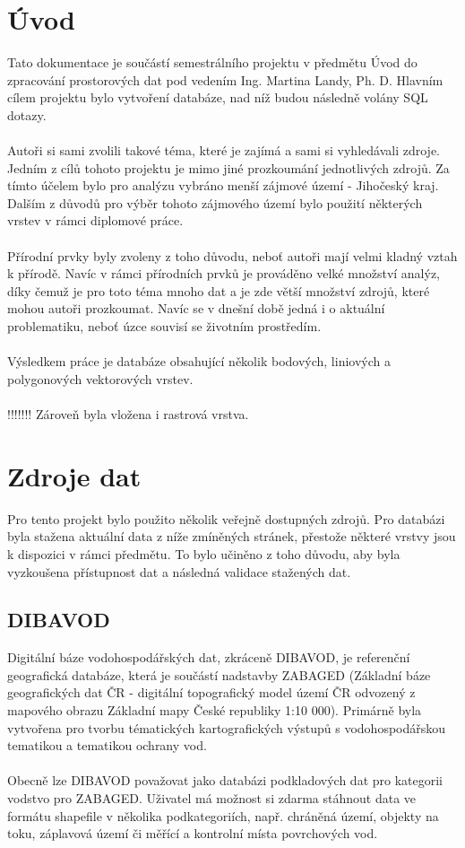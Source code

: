 \documentclass[a4paper, 12pt]{article}
\begin{document}
\section{Úvod}
Tato dokumentace je součástí semestrálního projektu v předmětu Úvod do zpracování prostorových dat pod vedením Ing. Martina Landy, Ph. D. Hlavním cílem projektu bylo vytvoření databáze, nad níž budou následně volány SQL dotazy.\\
\\
Autoři si sami zvolili takové téma, které je zajímá a sami si vyhledávali zdroje. Jedním z cílů tohoto projektu je mimo jiné prozkoumání jednotlivých zdrojů. Za tímto účelem bylo pro analýzu vybráno menší zájmové území - Jihočeský kraj. Dalším z důvodů pro výběr tohoto zájmového území bylo použití některých vrstev v rámci diplomové práce. \\
\\
Přírodní prvky byly zvoleny z toho důvodu, neboť autoři mají velmi kladný vztah k přírodě. Navíc v rámci přírodních prvků je prováděno velké množství analýz, díky čemuž je pro toto téma mnoho dat a je zde větší množství zdrojů, které mohou autoři prozkoumat. Navíc se v dnešní době jedná i o aktuální problematiku, neboť úzce souvisí se životním prostředím.\\
\\
Výsledkem práce je databáze obsahující několik bodových, liniových a polygonových vektorových vrstev. \\
\\

!!!!!!! Zároveň byla vložena i rastrová vrstva.

\clearpage
\section{Zdroje dat}
Pro tento projekt bylo použito několik veřejně dostupných zdrojů. Pro databázi byla stažena aktuální data z níže zmíněných stránek, přestože některé vrstvy jsou k dispozici v rámci předmětu. To bylo učiněno z toho důvodu, aby byla vyzkoušena přístupnost dat a následná validace stažených dat. 

\subsection{DIBAVOD}
Digitální báze vodohospodářských dat, zkráceně DIBAVOD, je referenční geografická databáze, která je součástí nadstavby ZABAGED (Základní báze geografických dat ČR - digitální topografický model území ČR odvozený z mapového obrazu Základní mapy České republiky 1:10 000). Primárně byla vytvořena pro tvorbu tématických kartografických výstupů s vodohospodářskou tematikou a tematikou ochrany vod. \\
\\
Obecně lze DIBAVOD považovat jako databázi podkladových dat pro kategorii vodstvo pro ZABAGED. Uživatel má možnost si zdarma stáhnout data ve formátu shapefile v několika podkategoriích, např. chráněná území, objekty na toku, záplavová území či měřící a kontrolní místa povrchových vod. 
\end{document}
